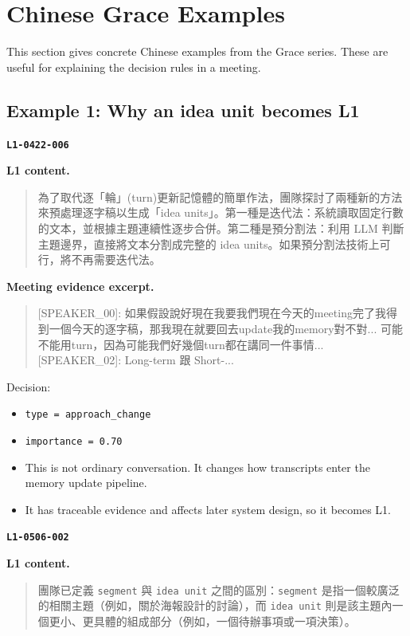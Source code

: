 \documentclass[11pt,a4paper]{article}
\newcommand{\code}[1]{{\footnotesize\texttt{#1}}}
\begin{document}
\section{Chinese Grace Examples}

This section gives concrete Chinese examples from the Grace series. These are useful for explaining the decision rules in a meeting.

\subsection{Example 1: Why an idea unit becomes L1}

\textbf{\code{L1-0422-006}}

\textbf{L1 content.}

\begin{quote}
為了取代逐「輪」(turn)更新記憶體的簡單作法，團隊探討了兩種新的方法來預處理逐字稿以生成「idea units」。第一種是迭代法：系統讀取固定行數的文本，並根據主題連續性逐步合併。第二種是預分割法：利用 LLM 判斷主題邊界，直接將文本分割成完整的 idea units。如果預分割法技術上可行，將不再需要迭代法。
\end{quote}

\textbf{Meeting evidence excerpt.}

\begin{quote}
[SPEAKER\_00]: 如果假設說好現在我要我們現在今天的meeting完了我得到一個今天的逐字稿，那我現在就要回去update我的memory對不對... 可能不能用turn，因為可能我們好幾個turn都在講同一件事情... [SPEAKER\_02]: Long-term 跟 Short-...
\end{quote}

Decision:

\begin{itemize}
  \item \code{type = approach\_change}
  \item \code{importance = 0.70}
  \item This is not ordinary conversation. It changes how transcripts enter the memory update pipeline.
  \item It has traceable evidence and affects later system design, so it becomes L1.
\end{itemize}

\textbf{\code{L1-0506-002}}

\textbf{L1 content.}

\begin{quote}
團隊已定義 \code{segment} 與 \code{idea unit} 之間的區別：\code{segment} 是指一個較廣泛的相關主題（例如，關於海報設計的討論），而 \code{idea unit} 則是該主題內一個更小、更具體的組成部分（例如，一個待辦事項或一項決策）。
\end{quote}
\end{document}
